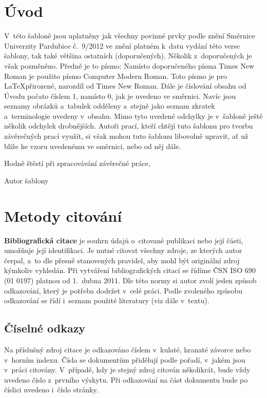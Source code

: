 \documentclass[12pt,a4paper]{report}															%
\begin{document}

\chapter{Úvod}

V~této šabloně jsou uplatněny jak všechny povinné prvky podle znění Směrnice Univerzity Pardubice č.~9/2012 ve znění platném k~datu vydání této verse šablony, tak také většina ostatních (doporučených). Několik z~doporučených je však pozměněno. Předně je to písmo: Namísto doporučeného písma Times New Roman je použito písmo Computer Modern Roman. Toto písmo je pro \LaTeX přirozené, narozdíl od Times New Roman. Dále je číslování obsahu od Úvodu počato číslem 1, namísto 0, jak je uvedeno ve směrnici. Navíc jsou seznamy obrázků a~tabulek odděleny a~stejně jako seznam zkratek a~terminologie uvedeny v~obsahu. Mimo tyto uvedené odchylky je v~šabloně ještě několik odchylek drobnějších. Autoři prací, kteří chtějí tuto šablonu pro tvorbu závěrečných prací využít, si však mohou tuto šablonu libovolně upravit, ať už blíže ke vzoru uvedenému ve směrnici, nebo od něj dále.

Hodně štěstí při zpracovávání závěrečné práce,

Autor šablony

\chapter{Metody citování}
\label{chap:mec}

\textbf{Bibliografická citace} je souhrn údajů o~citované publikaci nebo její části, umožňuje její identifikaci. Je nutné citovat všechny zdroje, ze kterých autor čerpal, a~to dle přesně stanovených pravidel, aby mohl být originální zdroj kýmkoliv vyhledán. Při vytváření bibliografických citací se řídíme ČSN ISO 690 (01 0197) platnou od 1.~dubna 2011. Dle této normy si autor zvolí jeden způsob odkazování, který je potřeba dodržet v~celé práci. Podle zvoleného způsobu odkazování se řídí i~seznam použité literatury (viz dále v~textu).

\section{Číselné odkazy}

Na příslušný zdroj citace je odkazováno číslem v~kulaté, hranaté závorce nebo v~horním indexu. Čísla se dokumentům přidělují podle pořadí, v~jakém jsou v~práci citovány. V~případě, kdy je stejný zdroj citován několikrát, bude vždy uvedeno číslo z~prvního výskytu. Při odkazování na část dokumentu bude po číslici uvedeno i~číslo stránky.
\end{document}
